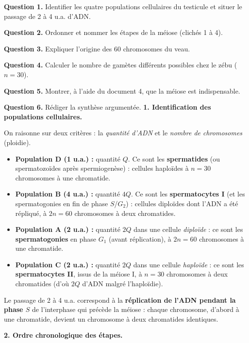 \documentclass[11pt]{article}
\begin{document}
\begin{exoresolu}
\textbf{Question 1.} Identifier les quatre populations cellulaires du testicule et situer le passage de 2 à 4 u.a. d'ADN.

\textbf{Question 2.} Ordonner et nommer les étapes de la méiose (clichés 1 à 4).

\textbf{Question 3.} Expliquer l'origine des 60 chromosomes du veau.

\textbf{Question 4.} Calculer le nombre de gamètes différents possibles chez le zébu ($n = 30$).

\textbf{Question 5.} Montrer, à l'aide du document 4, que la méiose est indispensable.

\textbf{Question 6.} Rédiger la synthèse argumentée.
\tcblower
\textbf{1. Identification des populations cellulaires.}

On raisonne sur deux critères : la \emph{quantité d'ADN} et le \emph{nombre de chromosomes} (ploidie).

\begin{itemize}
\item \textbf{Population D (1 u.a.) :} quantité $Q$. Ce sont les \textbf{spermatides} (ou spermatozoïdes après spermiogenèse) : cellules haploïdes à $n = 30$ chromosomes à une chromatide.
\item \textbf{Population B (4 u.a.) :} quantité $4Q$. Ce sont les \textbf{spermatocytes I} (et les spermatogonies en fin de phase $S$/$G_2$) : cellules diploïdes dont l'ADN a été répliqué, à $2n = 60$ chromosomes à deux chromatides.
\item \textbf{Population A (2 u.a.) :} quantité $2Q$ dans une cellule \emph{diploïde} : ce sont les \textbf{spermatogonies} en phase $G_1$ (avant réplication), à $2n = 60$ chromosomes à une chromatide.
\item \textbf{Population C (2 u.a.) :} quantité $2Q$ dans une cellule \emph{haploïde} : ce sont les \textbf{spermatocytes II}, issus de la méiose I, à $n = 30$ chromosomes à deux chromatides (d'où $2Q$ d'ADN malgré l'haploïdie).
\end{itemize}

Le passage de 2 à 4 u.a. correspond à la \textbf{réplication de l'ADN pendant la phase $S$} de l'interphase qui précède la méiose : chaque chromosome, d'abord à une chromatide, devient un chromosome à deux chromatides identiques.

\medskip
\textbf{2. Ordre chronologique des étapes.}


\end{exoresolu}
\end{document}

